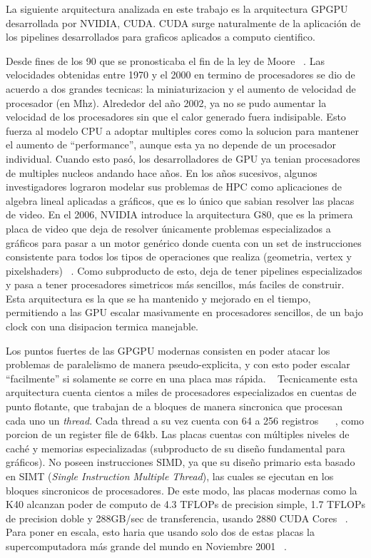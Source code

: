 La siguiente arquitectura analizada en este trabajo es la arquitectura GPGPU desarrollada por NVIDIA, CUDA.
CUDA surge naturalmente de la aplicaci\'on de los pipelines desarrollados para
graficos aplicados a computo cientifico.

Desde fines de los 90 que se pronosticaba el fin de la ley de Moore ~\cite{MooreLaw}. Las velocidades obtenidas
entre 1970 y el 2000 en termino de procesadores se dio de acuerdo a dos grandes tecnicas: la miniaturizacion
y el aumento de velocidad de procesador (en Mhz). Alrededor del a\~no 2002, ya no se pudo aumentar
la velocidad de los procesadores sin que el calor generado fuera indisipable. Esto fuerza al modelo
CPU a adoptar multiples cores como la solucion para mantener el aumento de ``performance'', aunque esta
ya no depende de un procesador individual. Cuando esto pas\'o, los desarrolladores de GPU ya tenian
procesadores de multiples nucleos andando hace a\~nos. En los a\~nos sucesivos, algunos investigadores
lograron modelar sus problemas de HPC como aplicaciones de algebra lineal aplicadas a gr\'aficos, que es
lo \'unico que sabian resolver las placas de video. En el 2006, NVIDIA introduce la arquitectura G80,
que es la primera placa de video que deja de resolver \'unicamente problemas especializados a gr\'aficos
para pasar a un motor gen\'erico donde cuenta con un set de instrucciones consistente para todos los
tipos de operaciones que realiza (geometria, vertex y pixelshaders) ~\cite{cudaHandbook}. Como subproducto de esto,
deja de tener pipelines especializados y pasa a tener procesadores simetricos m\'as sencillos, m\'as
faciles de construir. Esta arquitectura es la que se ha mantenido y mejorado en el tiempo, permitiendo
a las GPU escalar masivamente en procesadores sencillos, de un bajo clock con una disipacion termica
manejable.

Los puntos fuertes de las GPGPU modernas consisten en poder atacar los problemas de paralelismo
de manera pseudo-explicita, y con esto poder escalar ``facilmente'' si solamente se corre en una
placa mas r\'apida. ~\cite{} Tecnicamente esta arquitectura cuenta cientos a miles de procesadores
especializados en cuentas de punto flotante, que trabajan de a bloques de manera sincronica
 que procesan cada uno un \textit{thread}. Cada thread a su vez cuenta con
64 a 256 registros ~\cite{NvidiaFermi} ~\cite{NvidiaKepler}, como porcion de un register file de 64kb.
Las placas cuentas con m\'ultiples niveles de cach\'e y memorias especializadas (subproducto de
su dise\~no fundamental para gr\'aficos). No poseen instrucciones SIMD, ya que su dise\~no primario
esta basado en SIMT (\textit{Single Instruction Multiple Thread}), las cuales se ejecutan en los
bloques sincronicos de procesadores. De este modo, las placas modernas como la K40 alcanzan
poder de computo de 4.3 TFLOPs de precision simple, 1.7 TFLOPs de precision doble y 288GB/sec de
transferencia, usando 2880 CUDA Cores ~\cite{NvidiaKeplerDatasheet}. Para poner en escala, esto haria
que usando solo dos de estas placas la supercomputadora m\'as grande del mundo en Noviembre
2001 ~\cite{Top500November2001}.

